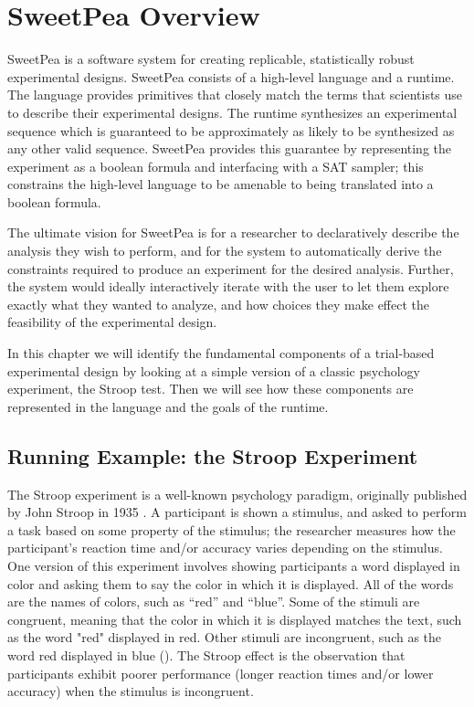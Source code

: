 
\chapter{SweetPea Overview}

SweetPea is a software system for creating replicable, statistically robust experimental designs. SweetPea consists of a high-level language and a runtime. The language provides primitives that closely match the terms that scientists use to describe their experimental designs. The runtime synthesizes an experimental sequence which is guaranteed to be approximately as likely to be synthesized as any other valid sequence. SweetPea provides this guarantee by representing the experiment as a boolean formula and interfacing with a SAT sampler; this constrains the high-level language to be amenable to being translated into a boolean formula.

The ultimate vision for SweetPea is for a researcher to declaratively describe the analysis they wish to perform, and for the system to automatically derive the constraints required to produce an experiment for the desired analysis. Further, the system would ideally interactively iterate with the user to let them explore exactly what they wanted to analyze, and how choices they make effect the feasibility of the experimental design.

In this chapter we will identify the fundamental components of a trial-based experimental design by looking at a simple version of a classic psychology experiment, the Stroop test. Then we will see how these components are represented in the language and the goals of the runtime.

\section{Running Example: the Stroop Experiment}


The Stroop experiment is a well-known psychology paradigm, originally published by John Stroop in 1935 \cite{stroop1935studies}. A participant is shown a stimulus, and asked to perform a task based on some property of the stimulus; the researcher measures how the participant's reaction time and/or accuracy varies depending on the stimulus. One version of this experiment involves showing participants a word displayed in color and asking them to say the color in which it is displayed. All of the words are the names of colors, such as ``red'' and ``blue''. Some of the stimuli are congruent, meaning that the color in which it is displayed matches the text, such as the word "red" displayed in red. Other stimuli are incongruent, such as the word red displayed in blue (). The Stroop effect is the observation that participants exhibit poorer performance (longer reaction times and/or lower accuracy) when the stimulus is incongruent.

